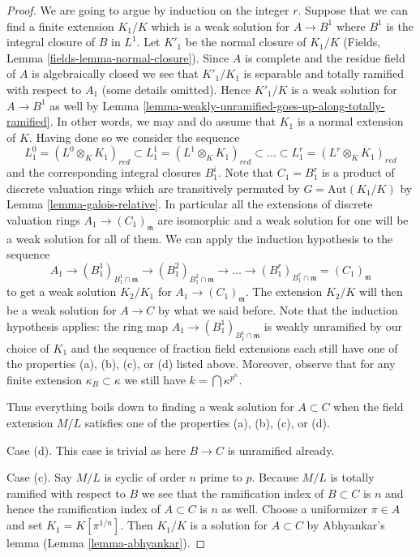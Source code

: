 \documentclass[10pt,a4paper]{amsart}
\theoremstyle{plain}
\theoremstyle{definition}
\theoremstyle{remark}
\numberwithin{equation}{subsection}
\begin{document}
\begin{proof}
\medskip\noindent
We are going to argue by induction on the integer $r$. Suppose that we
can find a finite extension $K_1/K$ which is a weak solution
for $A \to B^1$ where $B^1$ is the integral closure of $B$ in $L^1$.
Let $K'_1$ be the normal closure of $K_1/K$
(Fields, Lemma \ref{fields-lemma-normal-closure}).
Since $A$ is complete and the residue field of $A$ is algebraically closed
we see that $K'_1/K_1$ is separable and totally ramified with
respect to $A_1$ (some details omitted).
Hence $K'_1/K$ is a weak solution for $A \to B^1$ as well by
Lemma \ref{lemma-weakly-unramified-goes-up-along-totally-ramified}.
In other words, we may and do assume that $K_1$ is a normal extension of $K$.
Having done so we consider the sequence
$$
L^0_1 = (L^0 \otimes_K K_1)_{red} \subset
L^1_1 = (L^1 \otimes_K K_1)_{red} \subset \ldots \subset
L^r_1 = (L^r \otimes_K K_1)_{red}
$$
and the corresponding integral closures $B^i_1$. Note that $C_1 = B^r_1$
is a product of discrete valuation rings which are transitively permuted
by $G = \text{Aut}(K_1/K)$ by Lemma \ref{lemma-galois-relative}.
In particular all the extensions of discrete valuation rings
$A_1 \to (C_1)_\mathfrak m$ are isomorphic and a weak solution for one
will be a weak solution for all of them. We can apply the induction
hypothesis to the sequence
$$
A_1 \to (B^1_1)_{B^1_1 \cap \mathfrak m} \to
(B^2_1)_{B^2_1 \cap \mathfrak m} \to
\ldots \to
(B^r_1)_{B^r_1 \cap \mathfrak m} =
(C_1)_\mathfrak m
$$
to get a weak solution $K_2/K_1$ for $A_1 \to (C_1)_\mathfrak m$.
The extension $K_2/K$ will then be a weak solution for $A \to C$
by what we said before. Note that the induction hypothesis applies:
the ring map $A_1 \to (B^1_1)_{B^1_1 \cap \mathfrak m}$
is weakly unramified by our choice of $K_1$
and the sequence of fraction field extensions
each still have one of the properties (a), (b), (c), or (d)
listed above. Moreover, observe that for any finite extension 
$\kappa_B \subset \kappa$ we still have $k = \bigcap \kappa^{p^n}$.

\medskip\noindent
Thus everything boils down to finding a weak solution for $A \subset C$
when the field extension $M/L$ satisfies one of the properties
(a), (b), (c), or (d).

\medskip\noindent
Case (d). This case is trivial as here $B \to C$ is unramified already.

\medskip\noindent
Case (c). Say $M/L$ is cyclic of order $n$ prime to $p$. Because
$M/L$ is totally ramified with respect to $B$ we see that the ramification
index of $B \subset C$ is $n$ and hence the ramification index of $A \subset C$
is $n$ as well. Choose a uniformizer $\pi \in A$ and set
$K_1 = K[\pi^{1/n}]$. Then $K_1/K$ is a solution for $A \subset C$
by Abhyankar's lemma (Lemma \ref{lemma-abhyankar}).


\end{proof}
\end{document}

